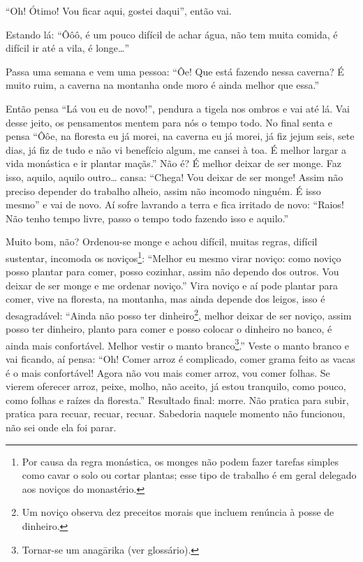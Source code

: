 “Oh! Ótimo! Vou ficar aqui, gostei daqui”, então vai. 

Estando lá: “Ôôô, é um pouco difícil de achar água, não tem muita
comida, é difícil ir até a vila, é longe…”

Passa uma semana e vem uma pessoa: “Ôe! Que está fazendo nessa
caverna? É muito ruim, a caverna na montanha onde moro é ainda melhor
que essa.”

Então pensa “Lá vou eu de novo!”, pendura a tigela nos ombros e vai
até lá. Vai desse jeito, os pensamentos mentem para nós o tempo todo.
No final senta e pensa “Ôôe, na floresta eu já morei, na caverna eu já
morei, já fiz jejum seis, sete dias, já fiz de tudo e não vi benefício
algum, me cansei à toa. É melhor largar a vida monástica e ir plantar
maçãs.” Não é? É melhor deixar de ser monge. Faz isso, aquilo, aquilo
outro… cansa: “Chega! Vou deixar de ser monge! Assim não preciso
depender do trabalho alheio, assim não incomodo ninguém. É isso mesmo”
e vai de novo. Aí sofre lavrando a terra e fica irritado de novo:
“Raios! Não tenho tempo livre, passo o tempo todo fazendo isso e
aquilo.” 

Muito bom, não? Ordenou-se monge e achou difícil, muitas regras,
difícil sustentar, incomoda os noviços\footnote{Por causa da regra
monástica, os monges não podem fazer tarefas simples como cavar o solo
ou cortar plantas; esse tipo de trabalho é em geral delegado aos
noviços do monastério.}: “Melhor eu mesmo virar noviço: como noviço
posso plantar para comer, posso cozinhar, assim não dependo dos outros.
Vou deixar de ser monge e me ordenar noviço.” Vira noviço e aí pode
plantar para comer, vive na floresta, na montanha, mas ainda depende
dos leigos, isso é desagradável: “Ainda não posso ter
dinheiro\footnote{Um noviço observa dez preceitos morais que incluem
renúncia à posse de dinheiro.}, melhor deixar de ser noviço, assim
posso ter dinheiro, planto para comer e posso colocar o dinheiro no
banco, é ainda mais confortável. Melhor vestir o manto
branco\footnote{Tornar-se um anag\=arika (ver glossário).}.” Veste o
manto branco e vai ficando, aí pensa: “Oh! Comer arroz é complicado,
comer grama feito as vacas é o mais confortável! Agora não vou mais
comer arroz, vou comer folhas. Se vierem oferecer arroz, peixe, molho,
não aceito, já estou tranquilo, como pouco, como folhas e raízes da
floresta.” Resultado final: morre. Não pratica para subir, pratica para
recuar, recuar, recuar. Sabedoria naquele momento não funcionou, não
sei onde ela foi parar. 


